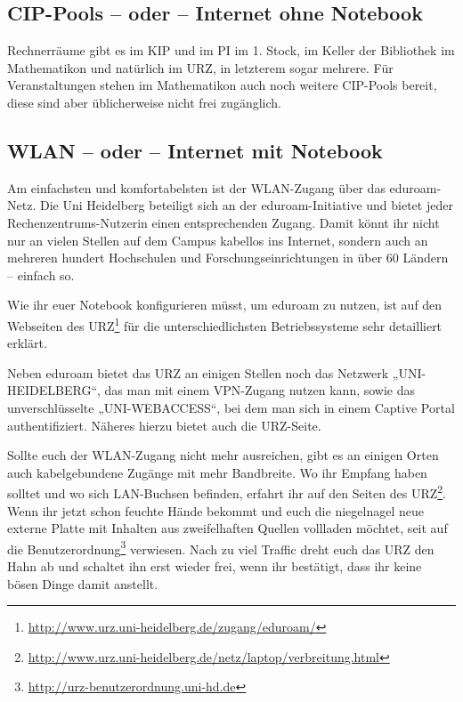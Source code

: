 \subsection{CIP-Pools -- oder -- Internet ohne Notebook}
Rechnerräume gibt es im \gls{KIP} und im \gls{PI} im 1. Stock, im Keller der Bibliothek im \gls{Mathematikon} und natürlich im \gls{URZ}, in letzterem sogar mehrere. Für Veranstaltungen stehen im Mathematikon auch noch weitere CIP-Pools bereit, diese sind aber üblicherweise nicht frei zugänglich.

\subsection{WLAN -- oder -- Internet mit Notebook}
Am einfachsten und komfortabelsten ist der WLAN-Zugang über das e\-du\-roam-Netz. Die Uni Heidelberg beteiligt sich an der eduroam-Initiative und bietet jeder Rechenzentrums-Nutzerin einen entsprechenden Zugang. Damit könnt ihr nicht nur an vielen Stellen auf dem Campus kabellos ins Internet, sondern auch an mehreren hundert Hochschulen und Forschungseinrichtungen in über 60 Ländern – einfach so.

Wie ihr euer Notebook konfigurieren müsst, um eduroam zu nutzen, ist auf den Webseiten des URZ\footnote{\url{http://www.urz.uni-heidelberg.de/zugang/eduroam/}} für die unterschiedlichsten Betriebssysteme sehr detailliert erklärt.

Neben eduroam bietet das URZ an einigen Stellen noch das Netzwerk „UNI-HEIDELBERG“, das man mit einem VPN-Zugang nutzen kann, sowie das unverschlüsselte „UNI-WEBACCESS“, bei dem man sich in einem Captive Portal authentifiziert. Näheres hierzu bietet auch die URZ-Seite.%

Sollte euch der WLAN-Zugang nicht mehr ausreichen, gibt es an einigen Orten auch kabelgebundene Zugänge mit mehr Bandbreite. Wo ihr Empfang haben solltet und wo sich LAN-Buchsen befinden, erfahrt ihr auf den Seiten des \gls{URZ}\footnote{\url{http://www.urz.uni-heidelberg.de/netz/laptop/verbreitung.html}}. Wenn ihr jetzt schon feuchte Hände bekommt und euch die niegelnagel neue externe Platte mit Inhalten aus zweifelhaften Quellen vollladen möchtet, seit auf die Benutzerordnung\footnote{\url{http://urz-benutzerordnung.uni-hd.de}} verwiesen. Nach zu viel Traffic dreht euch das \gls{URZ} den Hahn ab und schaltet ihn erst wieder frei, wenn ihr bestätigt, dass ihr keine bösen Dinge damit anstellt.


